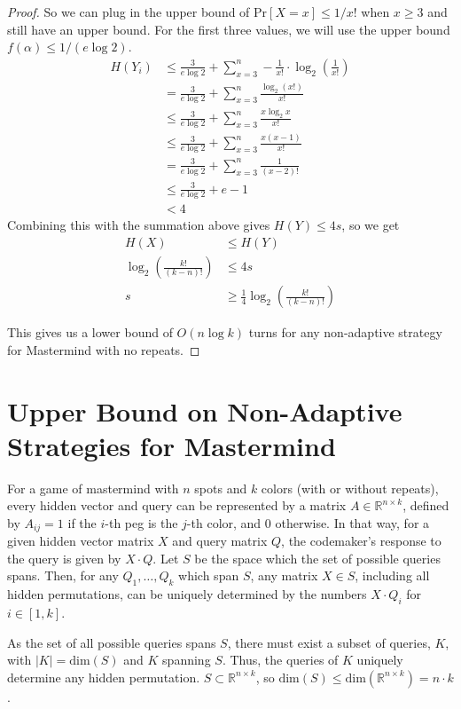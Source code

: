 \documentclass[12pt, a4paper]{article}
\begin{document}
\begin{proof}
So we can plug in the upper bound of $\text{Pr}[X=x]\le 1/x!$ when $x\ge 3$ and
still have an upper bound. For the first three values, we will use the upper bound
$f(\alpha)\le 1/(e\log 2)$. 
    \begin{align*}
    H(Y_i) &\leq \frac{3}{e\log 2}+\sum_{x=3}^n-\frac{1}{x!}\cdot\log_2(\frac{1}{x!})\\
    &= \frac{3}{e\log 2}+\sum_{x=3}^n \frac{\log_2(x!)}{x!}\\
    &\leq \frac{3}{e\log 2}+\sum_{x=3}^n \frac{x \log_2 x}{x!}\\
    &\leq \frac{3}{e\log 2}+\sum_{x=3}^n \frac{x (x-1)}{x!}\\
    &= \frac{3}{e\log 2}+\sum_{x=3}^n \frac{1}{(x-2)!}\\
    &\leq \frac{3}{e\log 2}+e-1\\
    & < 4
    \end{align*}
Combining this with the summation above gives $H(Y) \leq 4s$, so we get
	\begin{align*}
	H(X) &\leq H(Y)\\
	\log_2\left(\frac{k!}{(k-n)!}\right) &\leq 4s\\
	s &\geq \frac{1}{4}\log_2\left(\frac{k!}{(k-n)!}\right)
	\end{align*}

This gives us a lower bound of $O(n \log k)$ turns for any non-adaptive strategy for
Mastermind with no repeats.
\end{proof}

\clearpage
\section*{Upper Bound on Non-Adaptive Strategies for Mastermind}
For a game of mastermind with $n$ spots and $k$ colors (with or without repeats), every
hidden vector and query can be represented by a matrix $A\in\mathbb{R}^{n\times k}$,
defined by $A_{ij}=1$ if the $i$-th peg is the $j$-th color, and 0 otherwise.
In that way, for a given hidden vector matrix $X$ and query matrix $Q$,
the codemaker's response to the query is given by $X\cdot Q$.
Let $S$ be the space which the set of possible queries spans. Then, for any
$Q_1, \ldots, Q_k$ which span $S$, any matrix $X\in S$, including all hidden
permutations, can be uniquely determined by the numbers $X\cdot Q_i$ for $i\in [1,k]$.

As the set of all possible queries spans $S$, there must exist a subset of queries,
$K$, with $|K|=\text{dim}(S)$ and $K$ spanning $S$. Thus, the queries of $K$ uniquely
determine any hidden permutation. $S\subset \mathbb{R}^{n\times k}$,
so $\text{dim}(S)\le \text{dim}(\mathbb{R}^{n\times k})=n\cdot k$.
\end{document}
